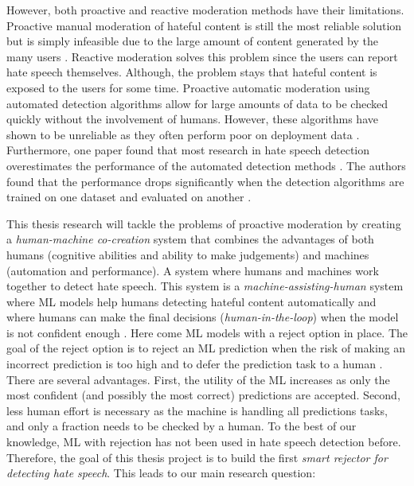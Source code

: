 However, both proactive and reactive moderation methods have their limitations. Proactive manual moderation of hateful content is still the most reliable solution but is simply infeasible due to the large amount of content generated by the many users \cite{balayn2021automatic}. Reactive moderation solves this problem since the users can report hate speech themselves. Although, the problem stays that hateful content is exposed to the users for some time. Proactive automatic moderation using automated detection algorithms allow for large amounts of data to be checked quickly without the involvement of humans. However, these algorithms have shown to be unreliable as they often perform poor on deployment data \cite{balayn2021automatic}. Furthermore, one paper found that most research in hate speech detection overestimates the performance of the automated detection methods \cite{arango2019hate}. The authors found that the performance drops significantly when the detection algorithms are trained on one dataset and evaluated on another \cite{arango2019hate}.

This thesis research will tackle the problems of proactive moderation by creating a \textit{human-machine co-creation} \cite{woo2020future} system that combines the advantages of both humans (cognitive abilities and ability to make judgements) and machines (automation and performance). A system where humans and machines work together to detect hate speech. This system is a \textit{machine-assisting-human} system where ML models help humans detecting hateful content automatically and where humans can make the final decisions (\textit{human-in-the-loop}) when the model is not confident enough \cite{woo2020future}. Here come ML models with a reject option in place. The goal of the reject option is to reject an ML prediction when the risk of making an incorrect prediction is too high and to defer the prediction task to a human \cite{hendrickx2021machine}. There are several advantages. First, the utility of the ML increases as only the most confident (and possibly the most correct) predictions are accepted. Second, less human effort is necessary as the machine is handling all predictions tasks, and only a fraction needs to be checked by a human. To the best of our knowledge, ML with rejection has not been used in hate speech detection before. Therefore, the goal of this thesis project is to build the first \textit{smart rejector for detecting hate speech}. This leads to our main research question:


